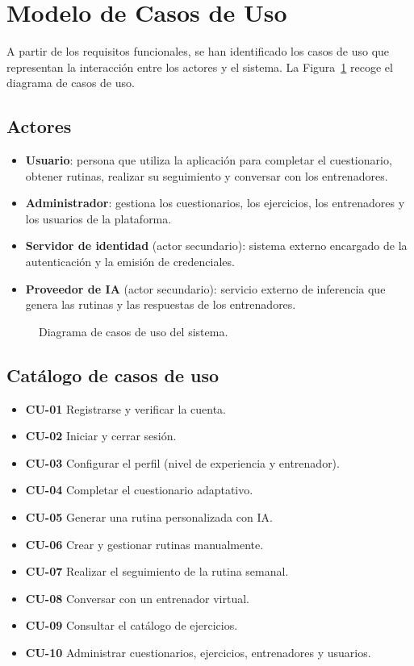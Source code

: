 \section{Modelo de Casos de Uso}
A partir de los requisitos funcionales, se han identificado los casos de uso que representan la interacción entre los actores y el sistema. La Figura~\ref{fig:casos-uso} recoge el diagrama de casos de uso.

\subsection*{Actores}
\begin{itemize}
    \item \textbf{Usuario}: persona que utiliza la aplicación para completar el cuestionario, obtener rutinas, realizar su seguimiento y conversar con los entrenadores.
    \item \textbf{Administrador}: gestiona los cuestionarios, los ejercicios, los entrenadores y los usuarios de la plataforma.
    \item \textbf{Servidor de identidad} (actor secundario): sistema externo encargado de la autenticación y la emisión de credenciales.
    \item \textbf{Proveedor de IA} (actor secundario): servicio externo de inferencia que genera las rutinas y las respuestas de los entrenadores.
\end{itemize}

\begin{figure}[ht]
\centering
\caption{Diagrama de casos de uso del sistema.}
\label{fig:casos-uso}
\end{figure}

\subsection*{Catálogo de casos de uso}
\begin{itemize}
    \item \textbf{CU-01} Registrarse y verificar la cuenta.
    \item \textbf{CU-02} Iniciar y cerrar sesión.
    \item \textbf{CU-03} Configurar el perfil (nivel de experiencia y entrenador).
    \item \textbf{CU-04} Completar el cuestionario adaptativo.
    \item \textbf{CU-05} Generar una rutina personalizada con IA.
    \item \textbf{CU-06} Crear y gestionar rutinas manualmente.
    \item \textbf{CU-07} Realizar el seguimiento de la rutina semanal.
    \item \textbf{CU-08} Conversar con un entrenador virtual.
    \item \textbf{CU-09} Consultar el catálogo de ejercicios.
    \item \textbf{CU-10} Administrar cuestionarios, ejercicios, entrenadores y usuarios.
\end{itemize}

